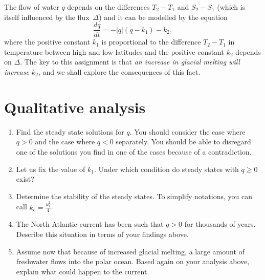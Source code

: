 \documentclass[10pt, letterpaper, answer]{exam}
\begin{document}
The flow of water $q$ depends on the differences $T_2 - T_1$ and $S_2 - S_1$ (which is itself influenced by the flux~$\Delta$) and it can be modelled by the equation
\begin{equation}
    \frac{dq}{dt} = -|q|(q - k_1) - k_2,
\end{equation}
where the positive constant $k_1$ is proportional to the difference $T_2 - T_1$ in temperature between high and low latitudes and the positive constant $k_2$ depends on $\Delta$. The key to this assignment is that \emph{an increase in glacial melting will increase $k_2$}, and we shall explore the consequences of this fact.

\section{Qualitative analysis}
\begin{enumerate}
    \item Find the steady state solutions for $q$. You should consider the case where $q>0$ and the case where $q<0$ separately.  You should be able to disregard one of the solutions you find in one of the cases because of a contradiction. 

    \item Let us fix the value of $k_1$. Under which condition do steady states with $q\geq0$ exist?

\item Determine the stability of the steady states. To simplify notations, you can call $k_c = \frac{k_1^2}{4}$.



\item The North Atlantic current has been such that $q>0$ for thousands of years. Describe this situation in terms of your findings above.



\item Assume now that because of increased glacial melting, a large amount of freshwater flows into the polar ocean. Based again on your analysis above, explain what could happen to the current.

 
\end{enumerate}

\end{document}
